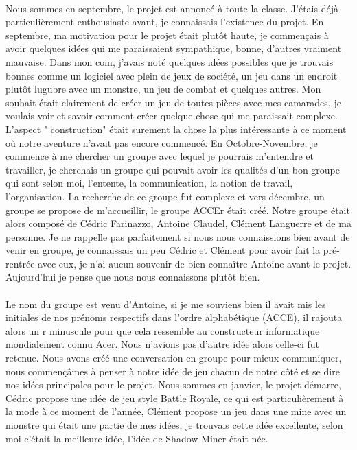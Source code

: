 \documentclass[titlepage, 13px, a4paper]{report}
\begin{document}
\paragraph{} \hspace{0pt}
Nous sommes en septembre, le projet est annoncé à toute la classe. 
J’étais déjà particulièrement enthousiaste avant, je connaissais l’existence du projet. 
En septembre, ma motivation pour le projet était plutôt haute, je commençais à avoir quelques idées 
qui me paraissaient sympathique, bonne, d’autres vraiment mauvaise. Dans mon coin, 
j’avais noté quelques idées possibles que je trouvais bonnes comme un logiciel avec plein de jeux de société, 
un jeu dans un endroit plutôt lugubre avec un monstre, un jeu de combat et quelques autres. 
Mon souhait était clairement de créer un jeu de toutes pièces avec mes camarades, 
je voulais voir et savoir comment créer quelque chose qui me paraissait complexe. 
L’aspect " construction"  était surement la chose la plus intéressante à ce moment où notre aventure 
n’avait pas encore commencé. En Octobre-Novembre, je commence à me chercher un groupe avec lequel je pourrais 
m’entendre et travailler, je cherchais un groupe qui pouvait avoir les qualités d’un bon groupe 
qui sont selon moi, l’entente, la communication, la notion de travail, l’organisation. 
La recherche de ce groupe fut complexe et vers décembre, un groupe se propose de m’accueillir, 
le groupe ACCEr était créé. Notre groupe était alors composé de Cédric Farinazzo, Antoine Claudel, 
Clément Languerre et de ma personne. Je ne rappelle pas parfaitement si nous nous connaissions 
bien avant de venir en groupe, je connaissais un peu Cédric et Clément pour avoir fait 
la pré-rentrée avec eux, je n’ai aucun souvenir de bien connaître Antoine avant le projet. 
Aujourd’hui je pense que nous nous connaissons plutôt bien. \\


\paragraph{} \hspace{0pt}
Le nom du groupe est venu d'Antoine, si je me souviens bien il avait mis les initiales de nos 
prénoms respectifs dans l’ordre alphabétique (ACCE), il rajouta alors un r minuscule pour 
que cela ressemble au constructeur informatique mondialement connu Acer. Nous n’avions pas 
d’autre idée alors celle-ci fut retenue. Nous avons créé une conversation en groupe pour 
mieux communiquer, nous commençâmes à penser à notre idée de jeu chacun de notre côté et 
se dire nos idées principales pour le projet. Nous sommes en janvier, le projet démarre, 
Cédric propose une idée de jeu style Battle Royale, ce qui est particulièrement à la mode 
à ce moment de l’année, Clément propose un jeu dans une mine avec un monstre qui était une 
partie de mes idées, je trouvais cette idée excellente, selon moi c’était la meilleure idée, 
l’idée de Shadow Miner était née. \\
\end{document}
